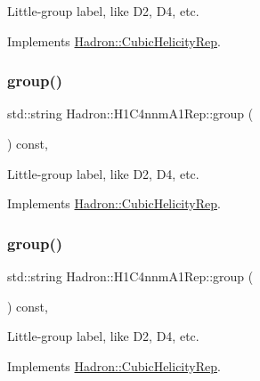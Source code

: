 Little-\/group label, like D2, D4, etc. 

Implements \mbox{\hyperlink{structHadron_1_1CubicHelicityRep_a101a7d76cd8ccdad0f272db44b766113}{Hadron\+::\+Cubic\+Helicity\+Rep}}.

\mbox{\label{structHadron_1_1H1C4nnmA1Rep_ac58ca1a17658ee7043603fb04a470665}} 
\subsubsection{\texorpdfstring{group()}{group()}\hspace{0.1cm}{\footnotesize\ttfamily [3/5]}}
{\footnotesize\ttfamily std\+::string Hadron\+::\+H1\+C4nnm\+A1\+Rep\+::group (\begin{DoxyParamCaption}{ }\end{DoxyParamCaption}) const\hspace{0.3cm}{\ttfamily [inline]}, {\ttfamily [virtual]}}

Little-\/group label, like D2, D4, etc. 

Implements \mbox{\hyperlink{structHadron_1_1CubicHelicityRep_a101a7d76cd8ccdad0f272db44b766113}{Hadron\+::\+Cubic\+Helicity\+Rep}}.

\mbox{\label{structHadron_1_1H1C4nnmA1Rep_ac58ca1a17658ee7043603fb04a470665}} 
\subsubsection{\texorpdfstring{group()}{group()}\hspace{0.1cm}{\footnotesize\ttfamily [4/5]}}
{\footnotesize\ttfamily std\+::string Hadron\+::\+H1\+C4nnm\+A1\+Rep\+::group (\begin{DoxyParamCaption}{ }\end{DoxyParamCaption}) const\hspace{0.3cm}{\ttfamily [inline]}, {\ttfamily [virtual]}}

Little-\/group label, like D2, D4, etc. 

Implements \mbox{\hyperlink{structHadron_1_1CubicHelicityRep_a101a7d76cd8ccdad0f272db44b766113}{Hadron\+::\+Cubic\+Helicity\+Rep}}.

